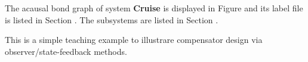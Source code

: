 

   The acausal bond graph of system \textbf{Cruise} is
   displayed in Figure  and its label
   file is listed in Section .
   The subsystems are listed in Section .


This is a simple teaching example to illustrare compensator design via
observer/state-feedback methods.

